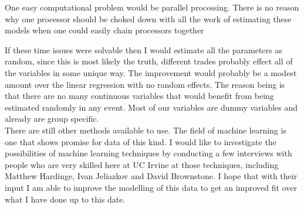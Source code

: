 \documentclass{article}
\begin{document}
One easy computational problem would be parallel processing. There is no reason why one processor should be choked down with all the work of estimating these models when one could easily chain processors together

If these time issues were solvable then I would estimate all the parameters as random, since this is most likely the truth, different trades probably effect all of the variables in some unique way. The improvement would probably be a modest amount over the linear regression with no random effects. The reason being is that there are no many continuous variables that would benefit from being estimated randomly in any event. Most of our variables are dummy variables and already are group specific. \\

There are still other methods available to use. The field of machine learning is one that shows promise for data of this kind. I would like to investigate the possibilities of machine learning techniques by conducting a few interviews with people who are very skilled here at UC Irvine at those techniques, including Matthew Hardinge, Ivan Jeliazkov and David Brownstone. I hope that with their input I am able to improve the modelling of this data to get an improved fit over what I have done up to this date. 
\end{document}
